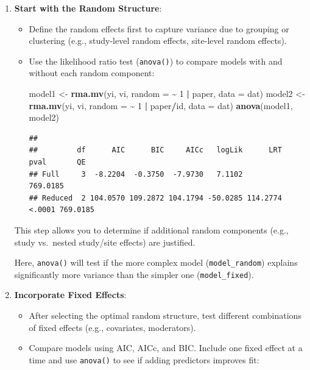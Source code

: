 \documentclass[
]{book}
\newenvironment{Shaded}{\begin{snugshade}}{\end{snugshade}}
\newcommand{\AttributeTok}[1]{\textcolor[rgb]{0.13,0.29,0.53}{#1}}
\newcommand{\DecValTok}[1]{\textcolor[rgb]{0.00,0.00,0.81}{#1}}
\newcommand{\FunctionTok}[1]{\textcolor[rgb]{0.13,0.29,0.53}{\textbf{#1}}}
\newcommand{\NormalTok}[1]{#1}
\newcommand{\OtherTok}[1]{\textcolor[rgb]{0.56,0.35,0.01}{#1}}
\newcommand{\SpecialCharTok}[1]{\textcolor[rgb]{0.81,0.36,0.00}{\textbf{#1}}}
\begin{document}
\begin{enumerate}
\def\labelenumi{\arabic{enumi}.}
\item
  \textbf{Start with the Random Structure}:

  \begin{itemize}
  \item
    Define the random effects first to capture variance due to grouping or clustering (e.g., study-level random effects, site-level random effects).
  \item
    Use the likelihood ratio test (\texttt{anova()}) to compare models with and without each random component:

\begin{Shaded}
\begin{Highlighting}[]
\NormalTok{model1 }\OtherTok{\textless{}{-}} \FunctionTok{rma.mv}\NormalTok{(yi, vi, }\AttributeTok{random =} \SpecialCharTok{\textasciitilde{}} \DecValTok{1} \SpecialCharTok{|}\NormalTok{ paper, }\AttributeTok{data =}\NormalTok{ dat)}
\NormalTok{model2 }\OtherTok{\textless{}{-}} \FunctionTok{rma.mv}\NormalTok{(yi, vi, }\AttributeTok{random =} \SpecialCharTok{\textasciitilde{}} \DecValTok{1} \SpecialCharTok{|}\NormalTok{ paper}\SpecialCharTok{/}\NormalTok{id, }\AttributeTok{data =}\NormalTok{ dat)}
\FunctionTok{anova}\NormalTok{(model1, model2)}
\end{Highlighting}
\end{Shaded}

\begin{verbatim}
## 
##         df      AIC      BIC     AICc   logLik      LRT   pval       QE 
## Full     3  -8.2204  -0.3750  -7.9730   7.1102                 769.0185 
## Reduced  2 104.0570 109.2872 104.1794 -50.0285 114.2774 <.0001 769.0185
\end{verbatim}
  \end{itemize}

  This step allows you to determine if additional random components (e.g., study vs.~nested study/site effects) are justified.

  Here, \texttt{anova()} will test if the more complex model (\texttt{model\_random}) explains significantly more variance than the simpler one (\texttt{model\_fixed}).
\item
  \textbf{Incorporate Fixed Effects}:

  \begin{itemize}
  \item
    After selecting the optimal random structure, test different combinations of fixed effects (e.g., covariates, moderators).
  \item
    Compare models using AIC, AICc, and BIC. Include one fixed effect at a time and use \texttt{anova()} to see if adding predictors improves fit:


\end{itemize}
\end{enumerate}
\end{document}
